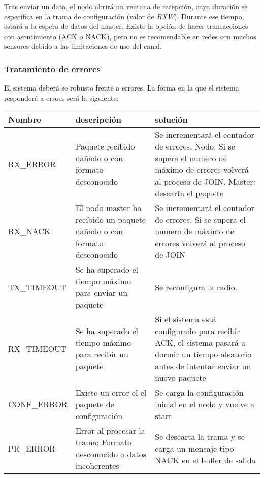 	Tras enviar un dato, el nodo abrirá un ventana de recepción, cuya duración se especifica en la trama de configuración (valor de \textit{RXW}). Durante ese tiempo, estará a la espera de datos del master. Existe la opción de hacer transacciones con asentimiento (ACK o NACK), pero   no es recomendable en redes con muchos sensores debido a las limitaciones de uso del canal.
	
	
	
	\subsubsection{Tratamiento de errores}
	
	El sistema deberá se robusto frente a errores. La forma en la que el sistema responderá a erroes será la siguiente:
	
	\begin{table}[!h]
			\begin{tabularx}{\textwidth}{|X|X|X|}
    			\hline
    	Nombre & descripción & solución \\
    	\hline \hline
    	
    	RX\_ERROR & Paquete recibido dañado o con formato desconocido  & Se incrementará el contador de errores. 
    	Nodo: Si se supera el numero de máximo de errores volverá al proceso de JOIN. Master: descarta el paquete  \\ \hline
    	RX\_NACK  & El nodo master ha recibido un paquete dañado o con formato desconocido &  Se incrementará el contador de errores. Si se supera el numero de máximo de errores volverá al proceso de JOIN \\ \hline
    	TX\_TIMEOUT & Se ha superado el tiempo máximo para enviar un paquete &  Se reconfigura la radio. \\ \hline
    	RX\_TIMEOUT & Se ha superado el tiempo máximo para recibir un paquete &  Si el sistema está configurado para recibir ACK, el sistema pasará a dormir un tiempo aleatorio antes de intentar enviar un nuevo paquete \\ \hline
    	CONF\_ERROR & Existe un error el el paquete de configuración & Se carga la configuración inicial en el nodo y vuelve a start \\ \hline
    	
    	      PR\_ERROR & Error al procesar la trama: Formato desconocido o datos incoherentes & Se descarta la trama y se carga un mensaje tipo NACK en el buffer de salida \\
         \hline
    	\end{tabularx}
    	
	\end{table}
	
